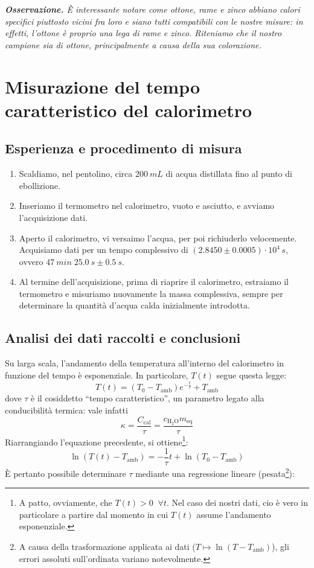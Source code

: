 \documentclass{article}
\newcommand*{\acqua}{{\text{H}_2\text{O}}}
\begin{document}
\emph{
    \textbf{Osservazione.}
    È interessante notare come ottone, rame e zinco abbiano calori specifici piuttosto vicini
    fra loro e siano tutti compatibili con le nostre misure: in effetti, l'ottone è proprio
    una lega di rame e zinco. Riteniamo che il nostro campione sia di ottone, principalmente
    a causa della sua colorazione.
}

\section{Misurazione del tempo caratteristico del calorimetro}

\subsection{Esperienza e procedimento di misura}

\begin{enumerate}
    \item
        Scaldiamo, nel pentolino, circa $\qty{200}{mL}$ di acqua distillata
        fino al punto di ebollizione.
    \item
        Inseriamo il termometro nel calorimetro, vuoto e asciutto, e avviamo
        l'acquisizione dati.
    \item
        Aperto il calorimetro, vi versaimo l'acqua, per poi richiuderlo velocemente.
        Acquisiamo dati per un tempo complessivo di
        $\left(2.8450\pm0.0005\right)\cdot10^4\,\unit{s}$, ovvero
        $\qty{47}{min}\;\qty{25.0}{s}\pm\qty{0.5}{s}$.
    \item
        Al termine dell'acquisizione, prima di riaprire il calorimetro, estraiamo
        il termometro e misuriamo nuovamente la massa complessiva, sempre per
        determinare la quantità d'acqua calda inizialmente introdotta.
\end{enumerate}

\subsection{Analisi dei dati raccolti e conclusioni}
Su larga scala, l'andamento della temperatura all'interno del calorimetro
in funzione del tempo è esponenziale. In particolare, $T(t)$ segue questa
legge:
\[
    T(t) = (T_0 - T_\text{amb}) e^{-\frac{t}{\tau}} + T_\text{amb}
\]
dove $\tau$ è il cosiddetto “tempo caratteristico”, un parametro legato
alla conducibilità termica: vale infatti
\[\kappa = \frac{C_\text{cal}}{\tau} = \frac{c_\acqua m_\text{eq}}{\tau}\]
Riarrangiando l'equazione precedente, si ottiene\footnote{
    A patto, ovviamente, che $T(t) > 0\;\;\forall t$.
    Nel caso dei nostri dati, cio è vero in particolare
    a partire dal momento in cui $T(t)$ assume l'andamento
    esponenziale.
}:
\[
    \ln(T(t) - T_\text{amb}) = -\frac{1}{\tau} t + \ln(T_0 - T_\text{amb})
\]
È pertanto possibile determinare $\tau$ mediante una regressione lineare (pesata\footnote{
    A causa della trasformazione applicata ai dati ($T \longmapsto \ln(T - T_\text{amb})$),
    gli errori assoluti sull'ordinata variano notevolmente.
}):
\end{document}
